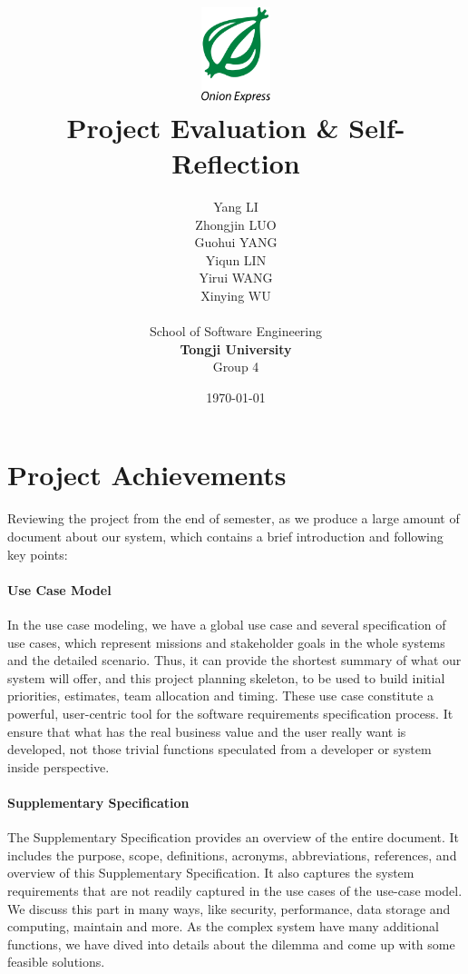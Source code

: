 \documentclass[12pt]{scrreprt}
\title{
\includegraphics[width=0.8in]{DocumentRes/OnionExpress.png} \\
\vspace*{1in}
\textbf{Project Evaluation \& Self-Reflection}}
\author{Yang LI\\
        Zhongjin LUO\\
        Guohui YANG\\
        Yiqun LIN\\
        Yirui WANG\\
        Xinying WU\\
		    \vspace*{0.5in} \\
		    School of Software Engineering\\
        \textbf{Tongji University}\\
        Group 4\\
}
\date{\today}
\begin{document}

\maketitle
\tableofcontents

\chapter{Project Achievements}
Reviewing the project from the end of semester, as we produce a large amount of document about our system, which contains a brief introduction and following key points:
\subsubsection{Use Case Model}
In the use case modeling, we have a global use case and several specification of use cases, which represent missions and stakeholder goals in the whole systems and the detailed scenario. Thus, it can provide the shortest summary of what our system will offer, and this project planning skeleton, to be used to build initial priorities, estimates, team allocation and timing. These use case constitute a powerful, user-centric tool for the software requirements specification process. It ensure that what has the real business value and the user really want is developed, not those trivial functions speculated from a developer or system inside perspective.
\subsubsection{Supplementary Specification}
The Supplementary Specification provides an overview of the entire document. It includes the purpose, scope, definitions, acronyms, abbreviations, references, and overview of this Supplementary Specification. It also captures the system requirements that are not readily captured in the use cases of the use-case model.\\
We discuss this part in many ways, like security, performance, data storage and computing, maintain and more. As the complex system have many additional functions, we have dived into details about the dilemma and come up with some feasible solutions.
\end{document}
